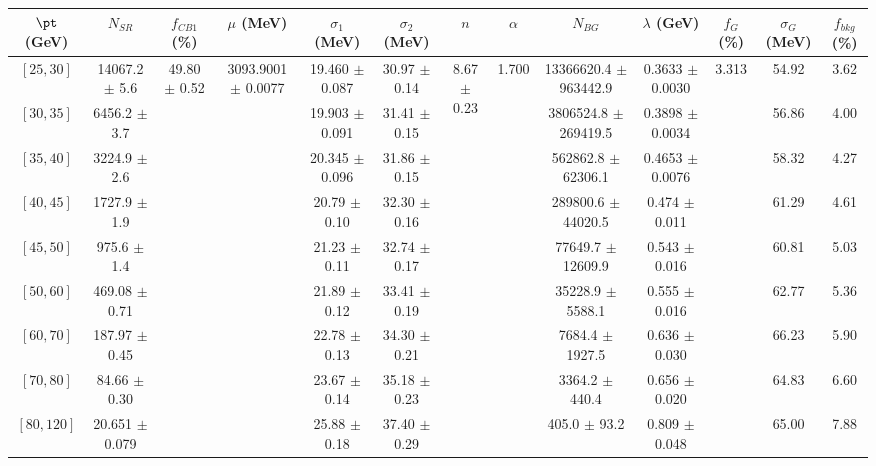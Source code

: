 \begin{tabular}{c||c|c|c|c|c|c|c|c|c|c|c||c}
$\pt$ (GeV) & $N_{SR}$ & $f_{CB1}$ (\%) & $\mu$ (MeV) & $\sigma_1$ (MeV) & $\sigma_2$ (MeV) & $n$ & $\alpha$ & $N_{BG}$ & $\lambda$ (GeV) & $f_G$ (\%) & $\sigma_G$ (MeV) & $f_{bkg}$ (\%) \\
\hline
$[25, 30]$ & 14067.2 $\pm$ 5.6 & \multirow{9}{*}{49.80 $\pm$ 0.52} & \multirow{9}{*}{3093.9001 $\pm$ 0.0077} & 19.460 $\pm$ 0.087 & 30.97 $\pm$ 0.14 & \multirow{9}{*}{8.67 $\pm$ 0.23} & \multirow{9}{*}{1.700} & 13366620.4 $\pm$ 963442.9 & 0.3633 $\pm$ 0.0030 & \multirow{9}{*}{3.313} & 54.92 & 3.62\\
$[30, 35]$ & 6456.2 $\pm$ 3.7 &  &  & 19.903 $\pm$ 0.091 & 31.41 $\pm$ 0.15 &  &  & 3806524.8 $\pm$ 269419.5 & 0.3898 $\pm$ 0.0034 &  & 56.86 & 4.00\\
$[35, 40]$ & 3224.9 $\pm$ 2.6 &  &  & 20.345 $\pm$ 0.096 & 31.86 $\pm$ 0.15 &  &  & 562862.8 $\pm$ 62306.1 & 0.4653 $\pm$ 0.0076 &  & 58.32 & 4.27\\
$[40, 45]$ & 1727.9 $\pm$ 1.9 &  &  & 20.79 $\pm$ 0.10 & 32.30 $\pm$ 0.16 &  &  & 289800.6 $\pm$ 44020.5 & 0.474 $\pm$ 0.011 &  & 61.29 & 4.61\\
$[45, 50]$ & 975.6 $\pm$ 1.4 &  &  & 21.23 $\pm$ 0.11 & 32.74 $\pm$ 0.17 &  &  & 77649.7 $\pm$ 12609.9 & 0.543 $\pm$ 0.016 &  & 60.81 & 5.03\\
$[50, 60]$ & 469.08 $\pm$ 0.71 &  &  & 21.89 $\pm$ 0.12 & 33.41 $\pm$ 0.19 &  &  & 35228.9 $\pm$ 5588.1 & 0.555 $\pm$ 0.016 &  & 62.77 & 5.36\\
$[60, 70]$ & 187.97 $\pm$ 0.45 &  &  & 22.78 $\pm$ 0.13 & 34.30 $\pm$ 0.21 &  &  & 7684.4 $\pm$ 1927.5 & 0.636 $\pm$ 0.030 &  & 66.23 & 5.90\\
$[70, 80]$ & 84.66 $\pm$ 0.30 &  &  & 23.67 $\pm$ 0.14 & 35.18 $\pm$ 0.23 &  &  & 3364.2 $\pm$ 440.4 & 0.656 $\pm$ 0.020 &  & 64.83 & 6.60\\
$[80, 120]$ & 20.651 $\pm$ 0.079 &  &  & 25.88 $\pm$ 0.18 & 37.40 $\pm$ 0.29 &  &  & 405.0 $\pm$ 93.2 & 0.809 $\pm$ 0.048 &  & 65.00 & 7.88\\
\end{tabular}
